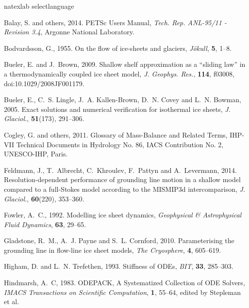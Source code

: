 \documentclass[twocolumn]{igs}
\begin{document}
\begin{thebibliography}{29}
\expandafter\ifx\csname natexlab\endcsname\relax\def\natexlab#1{#1}\fi
\expandafter\ifx\csname selectlanguage\endcsname\relax
  \def\selectlanguage#1{\relax}\fi

Balay, S. and others, 2014. {PETS}c {U}sers {M}anual, {\em Tech. Rep. ANL-95/11
  - Revision 3.4\/}, Argonne National Laboratory.

Bodvardsson, G., 1955. On the flow of ice-sheets and glaciers, {\em
  J{\"o}kull\/}, {\bf 5}, 1--8.

Bueler, E. and J.~Brown, 2009. Shallow shelf approximation as a ``sliding law''
  in a thermodynamically coupled ice sheet model, {\em J. Geophys. Res.\/},
  {\bf 114}, f03008, doi:10.1029/2008JF001179.

Bueler, E., C.~S. Lingle, J.~A. Kallen-Brown, D.~N. Covey and L.~N. Bowman,
  2005. Exact solutions and numerical verification for isothermal ice sheets,
  {\em J. Glaciol.\/}, {\bf 51}(173), 291--306.

Cogley, G. and others, 2011. Glossary of {M}ass-{B}alance and {R}elated
  {T}erms, {IHP-VII Technical Documents in Hydrology No. 86, IACS
  Contribution No. 2, UNESCO-IHP, Paris}.

Feldmann, J., T.~Albrecht, C.~Khroulev, F.~Pattyn and A.~Levermann, 2014.
  Resolution-dependent performance of grounding line motion in a shallow model
  compared to a full-{S}tokes model according to the {MISMIP3d}
  intercomparison, {\em J. Glaciol.\/}, {\bf 60}(220), 353--360.

Fowler, A.~C., 1992. Modelling ice sheet dynamics, {\em Geophysical \&
  Astrophysical Fluid Dynamics\/}, {\bf 63}, 29--65.

Gladstone, R.~M., A.~J. Payne and S.~L. Cornford, 2010. Parameterising the
  grounding line in flow-line ice sheet models, {\em The Cryosphere\/}, {\bf
  4}, 605--619.

Higham, D. and L.~N. Trefethen, 1993. Stiffness of {ODE}s, {\em BIT\/}, {\bf
  33}, 285--303.

Hindmarsh, A.~C, 1983. {ODEPACK, A Systematized Collection of ODE Solvers},
  {\em IMACS Transactions on Scientific Computation\/}, {\bf 1}, 55--64, edited
  by Stepleman et al.


\end{thebibliography}
\end{document}
